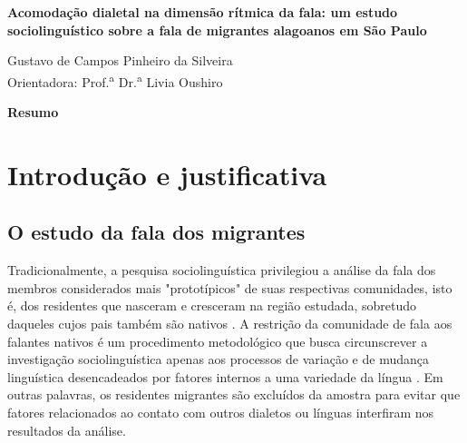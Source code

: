 \documentclass[
	a4paper,	%
	12pt,		%
	]{article}	%
\begin{document}
	
{ %

	\begin{center}
		{\bfseries\Large\sffamily
		    Acomodação dialetal na dimensão rítmica da fala: um estudo sociolinguístico
		    sobre a fala de migrantes alagoanos em São Paulo
		}
	\end{center}
}
	
\vspace{0.35em}

{ %

	\begin{flushright} 
		Gustavo de Campos Pinheiro da Silveira \\ 
		\vspace{5pt}
		Orientadora: Prof.\textsuperscript{a} Dr.\textsuperscript{a} Livia Oushiro
	\end{flushright}

	\begin{center} 
	    {\bfseries\sffamily Resumo} \\ 
	\end{center}
	\par
	\vspace{0.35em}
		
}

\section{Introdução e justificativa} 
\label{intro}

	\subsection{O estudo da fala dos migrantes}

	Tradicionalmente, a pesquisa sociolinguística privilegiou a análise da fala dos membros
	considerados mais "prototípicos" de suas respectivas comunidades, isto é, dos residentes que
	nasceram e cresceram na região estudada, sobretudo daqueles cujos pais também são nativos
	\citep{Britain1992, Kerswill1993, Milroy2002, Oushiro2016}. A restrição da comunidade de fala
	aos falantes nativos é um procedimento metodológico que busca circunscrever a investigação
	sociolinguística apenas aos processos de variação e de mudança linguística desencadeados por
	fatores internos a uma variedade da língua \citep[][p.  20]{Milroy2002, Labov2001}. Em outras
	palavras, os residentes migrantes são excluídos da amostra para evitar que fatores relacionados
	ao contato com outros dialetos ou línguas interfiram nos resultados da análise.
\end{document}
